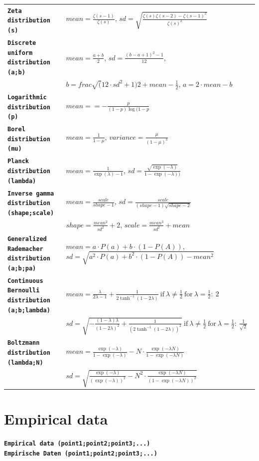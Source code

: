 \documentclass{svmono}
\def\cm#1{\textbf{\texttt{#1}}}
\begin{document}
{\begin{longtable}{l|l}
\cm{Zeta distribution (s)} & $ mean=\frac{\zeta(s-1)}{\zeta(s)}$, $ sd=\sqrt{\frac{\zeta(s)\zeta(s-2)-\zeta(s-1)^2}{\zeta(s)^2}}$ \\
\cm{Discrete uniform distribution (a;b)} & $mean=\frac{a+b}{2}$, $sd=\frac{(b-a+1)^2-1}{12}$,\\
~ &  $b=frac{\sqrt(12\cdot sd^2+1)}{2}+mean-\frac{1}{2}$, $a=2\cdot mean-b$ \\
\cm{Logarithmic distribution (p)} & $mean==-\frac{p}{(1-p)\log(1-p}$ \\
\cm{Borel distribution (mu)} & $mean=\frac{1}{1-\mu}$, $variance=\frac{\mu}{(1-\mu)^3}$ \\
\cm{Planck distribution (lambda)} & $mean=\frac{1}{\exp(\lambda)-1}$, $sd=\frac{\sqrt{\exp(-\lambda)}}{1-\exp(-\lambda))}$ \\
\cm{Inverse gamma distribution (shape;scale)} & $mean=\frac{scale}{shape-1}$, $sd=\frac{scale}{(shape-1)\sqrt{shape-2}}$ \\
~ & $shape=\frac{mean^2}{sd^2}+2$, $scale=\frac{mean^3}{sd^2}+mean$ \\
\cm{Generalized Rademacher distribution (a;b;pa)} & $mean=a\cdot P(a)+b\cdot(1-P(A))$, $sd=\sqrt{a^2\cdot P(a)+b^2\cdot(1-P(A))-mean^2}$ \\
\cm{Continuous Bernoulli distribution (a;b;lambda)} & $mean=\frac{\lambda}{2\lambda-1}+\frac{1}{2\tanh^{-1}(1-2\lambda)} ~\text{if}~ \lambda\neq\frac{1}{2} ~\text{for}~ \lambda=\frac{1}{2}:~ 2$ \\
~ & $sd=\sqrt{-\frac{(1-\lambda)\lambda}{(1-2\lambda)^2}+\frac{1}{(2\tanh^{-1}(1-2\lambda))^2}} ~\text{if}~ \lambda\neq\frac{1}{2} ~\text{for}~ \lambda=\frac{1}{2}:~ \frac{1}{\sqrt{2}}$ \\
\cm{Boltzmann distribution (lambda;N)} & $mean=\frac{\exp(-\lambda)}{1-\exp(-\lambda)}-N\cdot\frac{\exp(-\lambda N)}{1-\exp(-\lambda N)}$ \\
~ & $sd=\sqrt{\frac{\exp(-\lambda)}{(\exp(-\lambda))^2}-N^2\cdot\frac{\exp(-\lambda N)}{(1-\exp(-\lambda N))^2}}$
\end{longtable}
}





\section*{Empirical data}

\cm{Empirical data (point1;point2;point3;...)}~\\
\cm{Empirische Daten (point1;point2;point3;...)}
\end{document}

